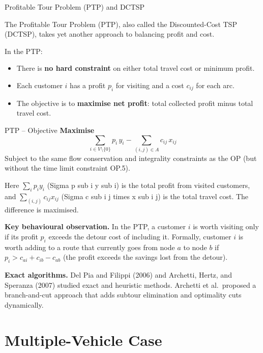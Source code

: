 \documentclass[aspectratio=169,10pt]{beamer}
\begin{document}
\begin{frame}[allowframebreaks]{Profitable Tour Problem (PTP) and DCTSP}

  The Profitable Tour Problem (PTP), also called the Discounted-Cost TSP
  (DCTSP), takes yet another approach to balancing profit and cost.

  \medskip
  In the PTP:
  \begin{itemize}
    \item There is \textbf{no hard constraint} on either total travel cost
          or minimum profit.
    \item Each customer $i$ has a profit $p_i$ for visiting and a cost
          $c_{ij}$ for each arc.
    \item The objective is to \textbf{maximise net profit}:
          total collected profit minus total travel cost.
  \end{itemize}

  \medskip
  \begin{block}{PTP -- Objective}
    \textbf{Maximise}
    \[
      \sum_{i \in V \setminus \{0\}} p_i \, y_i
      - \sum_{(i,j) \in A} c_{ij} \, x_{ij}
      \tag{PTP.obj}
    \]
    Subject to the same flow conservation and integrality constraints as
    the OP (but without the time limit constraint OP.5).
  \end{block}

  \medskip
  Here $\sum_{i} p_i y_i$ (Sigma p sub i y sub i) is the total profit
  from visited customers, and $\sum_{(i,j)} c_{ij} x_{ij}$
  (Sigma c sub i j times x sub i j) is the total travel cost.
  The difference is maximised.

  \medskip
  \textbf{Key behavioural observation.}
  In the PTP, a customer $i$ is worth visiting only if its profit $p_i$
  exceeds the detour cost of including it.
  Formally, customer $i$ is worth adding to a route that currently goes
  from node $a$ to node $b$ if
  $p_i > c_{ai} + c_{ib} - c_{ab}$
  (the profit exceeds the savings lost from the detour).

  \medskip
  \textbf{Exact algorithms.}
  Del Pia and Filippi (2006) and Archetti, Hertz, and Speranza (2007)
  studied exact and heuristic methods.
  Archetti et al.\ proposed a branch-and-cut approach that adds subtour
  elimination and optimality cuts dynamically.

\end{frame}

\section{Multiple-Vehicle Case}
\end{document}
